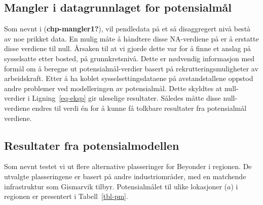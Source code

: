 \documentclass[
]{article}
\begin{document}
\hypertarget{mangler-i-datagrunnlaget-for-potensialmuxe5l}{%
\subsection{Mangler i datagrunnlaget for
potensialmål}\label{mangler-i-datagrunnlaget-for-potensialmuxe5l}}

Som nevnt i (\textbf{chp-mangler1?}), vil pendledata på et så
disaggregert nivå bestå av noe prikket data. En mulig måte å håndtere
disse NA-verdiene på er å erstatte disse verdiene til null. Årsaken til
at vi gjorde dette var for å finne et anslag på sysselsatte etter
bosted, på grunnkretsnivå. Dette er nødvendig informasjon med formål om
å beregne ut potensialmål-verdier basert på rekrutteringsmuligheter av
arbeidskraft. Etter å ha koblet sysselsettingsdataene på avstandstallene
oppstod andre problemer ved modelleringen av potensialmål. Dette
skyldtes at null-verdier i Ligning~\ref{eq-eksp} gir uleselige
resultater. Således måtte disse null-verdiene endres til verdi én for å
kunne få tolkbare resultater fra potensialmål verdiene.

\hypertarget{resultater-fra-potensialmodellen}{%
\subsection{Resultater fra
potensialmodellen}\label{resultater-fra-potensialmodellen}}

Som nevnt testet vi ut flere alternative plasseringer for Beyonder i
regionen. De utvalgte plasseringene er basert på andre industriområder,
med en matchende infrastruktur som Gismarvik tilbyr. Potensialmålet til
ulike lokasjoner (\(a\)) i regionen er presentert i Tabell~\ref{tbl-pm}.
\end{document}
